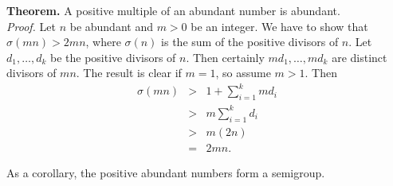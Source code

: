\documentclass[12pt]{article}
\begin{document}
{\bf Theorem.} A positive multiple of an abundant number is abundant. \\
\emph{Proof.} Let $n$ be abundant and $m >0$ be an integer. We have to show
that $\sigma (mn) > 2mn$,  where $\sigma(n)$ is the sum of the positive divisors of $n$.
 Let $d_1, \ldots,  d_k$ be the positive divisors of $n$. Then
certainly $md_1, \ldots, md_k$ are distinct divisors of $mn$. The result is
clear if $m=1$, so assume $m>1$. Then
\begin{eqnarray*}
\sigma(mn) &>& 1+ \sum_{i=1}^k md_i \\
&>& m \sum_{i=1}^k d_i \\
&>& m(2n) \\
&=& 2mn.
\end{eqnarray*}

As a corollary, the positive abundant numbers form a semigroup.


 
\end{document}

